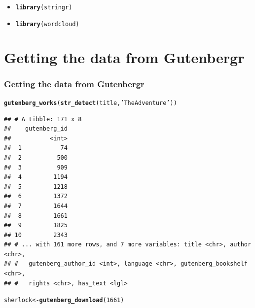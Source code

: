 \documentclass{beamer}\usepackage[]{graphicx}\usepackage[]{color}
\makeatletter
\newcommand{\hlnum}[1]{\textcolor[rgb]{0.686,0.059,0.569}{#1}}%
\newcommand{\hlstr}[1]{\textcolor[rgb]{0.192,0.494,0.8}{#1}}%
\newcommand{\hlstd}[1]{\textcolor[rgb]{0.345,0.345,0.345}{#1}}%
\newcommand{\hlkwb}[1]{\textcolor[rgb]{0.69,0.353,0.396}{#1}}%
\newcommand{\hlkwd}[1]{\textcolor[rgb]{0.737,0.353,0.396}{\textbf{#1}}}%
\newenvironment{kframe}{%
 \def\at@end@of@kframe{}%
 \ifinner\ifhmode%
  \def\at@end@of@kframe{\end{minipage}}%
  \begin{minipage}{\columnwidth}%
 \fi\fi%
 \def\FrameCommand##1{\hskip\@totalleftmargin \hskip-\fboxsep
 \colorbox{shadecolor}{##1}\hskip-\fboxsep
     \hskip-\linewidth \hskip-\@totalleftmargin \hskip\columnwidth}%
 \MakeFramed {\advance\hsize-\width
   \@totalleftmargin\z@ \linewidth\hsize
   \@setminipage}}%
 {\par\unskip\endMakeFramed%
 \at@end@of@kframe}
\newenvironment{knitrout}{}{} %
\makeatother
\begin{document}
\begin{frame}[fragile]
\begin{itemize}
\begin{knitrout}
\begin{kframe}
\end{kframe}
\end{knitrout}
    \item<5->
\begin{knitrout}
\color{fgcolor}\begin{kframe}
\begin{alltt}
\hlkwd{library}\hlstd{(stringr)}
\end{alltt}
\end{kframe}
\end{knitrout}
    \item<6->
\begin{knitrout}
\color{fgcolor}\begin{kframe}
\begin{alltt}
 \hlkwd{library}\hlstd{(wordcloud)}
\end{alltt}
\end{kframe}
\end{knitrout}
    \end{itemize}
\end{frame}

\section{Getting the data from Gutenbergr}

\begin{frame}[fragile] 

  \frametitle{Getting the data from Gutenbergr}
\begin{knitrout}
\color{fgcolor}\begin{kframe}
\begin{alltt}
\hlkwd{gutenberg_works}\hlstd{(}\hlkwd{str_detect}\hlstd{(title,}\hlstr{'The Adventure'}\hlstd{))}
\end{alltt}
\begin{verbatim}
## # A tibble: 171 x 8
##    gutenberg_id
##           <int>
##  1           74
##  2          500
##  3          909
##  4         1194
##  5         1218
##  6         1372
##  7         1644
##  8         1661
##  9         1825
## 10         2343
## # ... with 161 more rows, and 7 more variables: title <chr>, author <chr>,
## #   gutenberg_author_id <int>, language <chr>, gutenberg_bookshelf <chr>,
## #   rights <chr>, has_text <lgl>
\end{verbatim}
\begin{alltt}
\hlstd{sherlock}\hlkwb{<-}\hlkwd{gutenberg_download}\hlstd{(}\hlnum{1661}\hlstd{)}
\end{alltt}


{\ttfamily\noindent\itshape\color{messagecolor}{\#\# Determining mirror for Project Gutenberg from http://www.gutenberg.org/robot/harvest}}

{\ttfamily\noindent\itshape\color{messagecolor}{\#\# Using mirror http://aleph.gutenberg.org}}\end{kframe}
\end{knitrout}
\end{frame}
\end{document}
